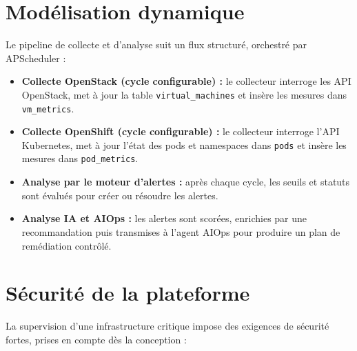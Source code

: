 \documentclass[11pt,a4paper]{report}
\begin{document}
\newpage
\section{Modélisation dynamique}

Le pipeline de collecte et d'analyse suit un flux structuré, orchestré par
APScheduler :

\begin{itemize}[label=\textbullet, leftmargin=1.5cm, labelsep=0.5cm,
                itemsep=0.4em, parsep=0em, topsep=0.4em]

    \item \textbf{Collecte OpenStack (cycle configurable) :} le collecteur
    interroge les API OpenStack, met à jour la table
    \texttt{virtual\_machines} et insère les mesures dans
    \texttt{vm\_metrics}.

    \item \textbf{Collecte OpenShift (cycle configurable) :} le collecteur
    interroge l'API Kubernetes, met à jour l'état des pods et namespaces
    dans \texttt{pods} et insère les mesures dans \texttt{pod\_metrics}.

    \item \textbf{Analyse par le moteur d'alertes :} après chaque cycle, les
    seuils et statuts sont évalués pour créer ou résoudre les alertes.

    \item \textbf{Analyse IA et AIOps :} les alertes sont scorées, enrichies
    par une recommandation puis transmises à l'agent AIOps pour produire un
    plan de remédiation contrôlé.

\end{itemize}

\section{Sécurité de la plateforme}

La supervision d'une infrastructure critique impose des exigences de
sécurité fortes, prises en compte dès la conception :
\end{document}
